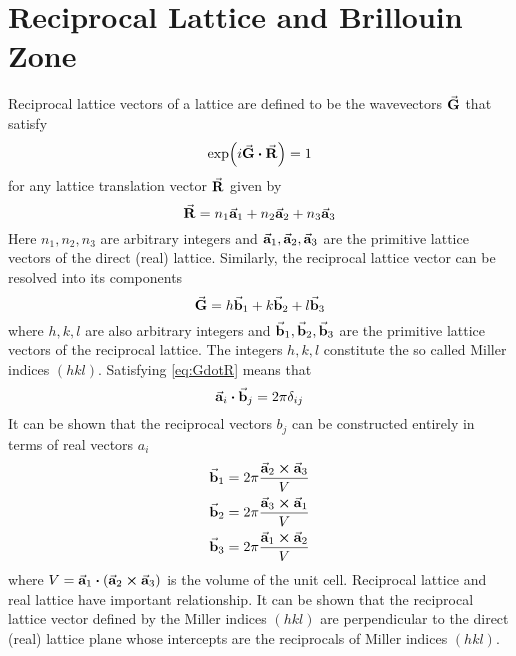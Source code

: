 \addappheadtotoc
\appendix

\makeatletter
\renewcommand{\@makechapterhead}[1]{\vspace *{-10\p@ }{\parindent \z@
		\raggedright \normalfont \ifnum \c@secnumdepth >\m@ne \Huge \bfseries
			\@chapapp \space \thechapter \vskip 10\p@ \fi #1\par \nobreak \vskip 30\p@ }}
\makeatother

\chapter{Reciprocal Lattice and Brillouin Zone}\label{chap:BZ}
Reciprocal lattice vectors of a lattice are defined to be the wavevectors  $\va{G}$ that satisfy
\begin{equation} \label{eq:GdotR}
	\exp(i \va{G} \vdot \va{R} ) = 1
\end{equation}
for any lattice translation vector $\va{R}$ given by
\begin{equation}
	\va{R} = n_1 \va{a}_1 + n_2 \va{a}_2 +n_3 \va{a}_3
\end{equation}
Here $n_1, n_2, n_3$ are arbitrary integers and $\va{a}_1, \va{a}_2, \va{a}_3$ are the primitive lattice vectors of the direct (real) lattice. Similarly, the reciprocal lattice vector can be resolved into its components
\begin{equation}
	\va{G} = h \va{b}_1 + k \va{b}_2 + l \va{b}_3
\end{equation}
where $h, k, l$ are also  arbitrary integers and $\va{b}_1, \va{b}_2, \va{b}_3$ are the primitive lattice vectors of the reciprocal lattice. The integers $h, k, l$ constitute the so called Miller indices $(hkl)$. Satisfying \eqref{eq:GdotR} means that
\begin{equation*}
	\va{a}_i \vdot \va{b}_j = 2 \pi \delta_{ij}
\end{equation*}
It can be shown that the reciprocal vectors $b_j$ can be constructed entirely in terms of real vectors $a_i$
\begin{align}
	\va{b}_1 & = 2 \pi \frac{\va{a}_2 \crossproduct \va{a}_3}{V} \notag                  \\
	\va{b}_2 & = 2 \pi \frac{\va{a}_3 \crossproduct \va{a}_1}{V} \label{eq:recipro_real} \\
	\va{b}_3 & = 2 \pi \frac{\va{a}_1 \crossproduct \va{a}_2}{V} \notag
\end{align}
where $V = \va{a}_1 \vdot (\va{a}_2 \crossproduct \va{a}_3)$ is the volume of the unit cell. Reciprocal lattice and real lattice have important relationship. It can be shown that the reciprocal lattice vector defined by the Miller indices $(hkl)$ are perpendicular to the direct (real) lattice plane whose intercepts are the reciprocals of Miller indices $(hkl)$.

